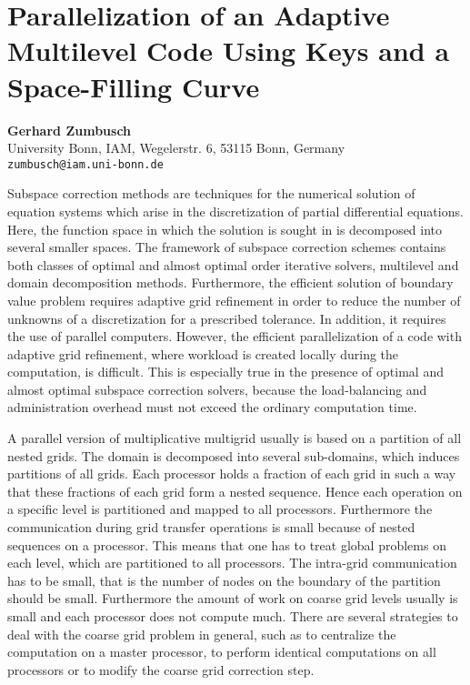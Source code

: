 \documentclass[11pt]{article}
\newcommand{\nextab}[4]{
	\section{#2}
	{\bf #1} \\ \nopagebreak
	{#3} \\ \nopagebreak
	{\tt #4} \nopagebreak
	}
\begin{document}

\nextab{Gerhard Zumbusch}
	{Parallelization of an Adaptive Multilevel Code Using Keys and
		a Space-Filling Curve}
	{University Bonn, IAM, Wegelerstr. 6, 53115 Bonn, Germany}
	{zumbusch@iam.uni-bonn.de}

Subspace correction methods are techniques for the numerical solution
of equation systems which arise in the discretization of partial differential
equations. Here, the function space in which the solution is sought in
is decomposed into several smaller spaces. The framework of subspace correction
schemes contains both classes of optimal and almost optimal order iterative
solvers, multilevel and domain decomposition methods. Furthermore, the
efficient solution of boundary value problem requires adaptive grid refinement
in order to reduce the number of unknowns of a discretization for a prescribed
tolerance. In addition, it requires the use of parallel computers. However,
the efficient parallelization of a code with adaptive grid refinement,
where workload is created locally during the computation, is difficult.
This is especially true in the presence of optimal and almost optimal subspace
correction solvers, because the load-balancing and administration overhead
must not exceed the ordinary computation time.

A parallel version of multiplicative multigrid usually is based on a
partition of all nested grids. The domain is decomposed into several sub-domains,
which induces partitions of all grids. Each processor holds a fraction
of each grid in such a way that these fractions of each grid form a nested
sequence. Hence each operation on a specific level is partitioned and mapped
to all processors. Furthermore the communication during grid transfer operations
is small because of nested sequences on a processor. This means that one
has to treat global problems on each level, which are partitioned to all
processors. The intra-grid communication has to be small, that is the number
of nodes on the boundary of the partition should be small. Furthermore
the amount of work on coarse grid levels usually is small and each processor
does not compute much. There are several strategies to deal with the coarse
grid problem in general, such as to centralize the computation on a master
processor, to perform identical computations on all processors or to modify
the coarse grid correction step.
\end{document}
